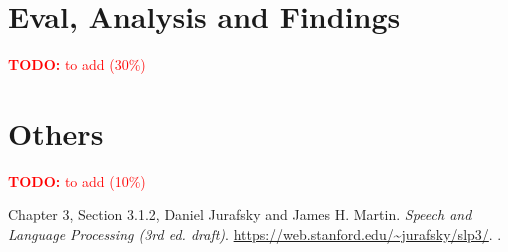 \documentclass[a4paper]{article}
\newcommand{\todo}[1]{\textcolor{red}{\textbf{TODO:} #1}}
\begin{document}
\section{Eval, Analysis and Findings}
\todo{to add (30\%)}


\section{Others}
\todo{to add (10\%)}

\newpage
\begin{thebibliography}{9}

Chapter 3, Section 3.1.2, Daniel Jurafsky and James H. Martin.
\newblock \textit{Speech and Language Processing (3rd ed. draft)}.
\newblock \url{https://web.stanford.edu/~jurafsky/slp3/}.
.

\end{thebibliography}
\end{document}
